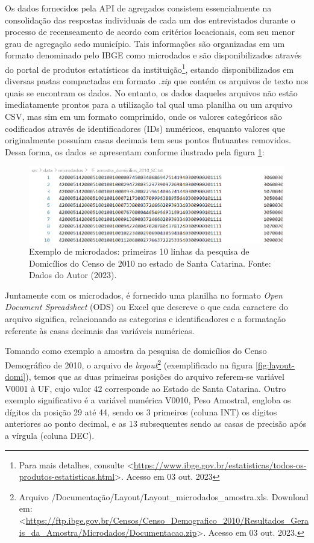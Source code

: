     Os dados fornecidos pela API de agregados consistem essencialmente na consolidação das respostas individuais de cada um dos entrevistados durante o processo de recenseamento de acordo com critérios locacionais, com seu menor grau de agregação sedo município. Tais informações são organizadas em um formato denominado pelo IBGE como microdados e são disponibilizados através do portal de produtos estatísticos da instituição\footnote{Para mais detalhes, consulte <\url{https://www.ibge.gov.br/estatisticas/todos-os-produtos-estatisticas.html}>. Acesso em 03 out. 2023}, estando disponibilizados em diversas pastas compactadas em formato \textit{.zip} que contém os arquivos de texto nos quais se encontram os dados. No entanto, os dados daqueles arquivos não estão imediatamente prontos para a utilização tal qual uma planilha ou um arquivo CSV, mas sim em um formato comprimido, onde os valores categóricos são codificados através de identificadores (IDs) numéricos, enquanto valores que originalmente possuíam casas decimais tem seus pontos flutuantes removidos. Dessa forma, os dados se apresentam conforme ilustrado pela figura \ref{fig:exemplo-microdado}:

\begin{figure}[h]
    \centering
    \includegraphics[width=\textwidth]{files/img/exemplo_microdado.png}
    \caption{Exemplo de microdados: primeiras 10 linhas da pesquisa de Domicílios do Censo de 2010 no estado de Santa Catarina. Fonte: Dados do Autor (2023).}
    \label{fig:exemplo-microdado}
\end{figure}

    Juntamente com os microdados, é fornecido uma planilha no formato \textit{Open Document Spreadsheet} (ODS) ou Excel que descreve o que cada caractere do arquivo significa, relacionando as categorias e identificadores e a formatação referente às casas decimais das variáveis numéricas. 
    
    Tomando como exemplo a amostra da pesquisa de domicílios do Censo Demográfico de 2010, o arquivo de \textit{layout}\footnote{\label{fn-layout-domi}Arquivo /Documentação/Layout/Layout\_microdados\_amostra.xls. Download em: <\url{https://ftp.ibge.gov.br/Censos/Censo_Demografico_2010/Resultados_Gerais_da_Amostra/Microdados/Documentacao.zip}>. Acesso em 03 out. 2023.} (exemplificado na figura \ref{fig:layout-domi}), temos que as duas primeiras posições do arquivo referem-se variável V0001 à UF, cujo valor 42 corresponde ao Estado de Santa Catarina. Outro exemplo significativo é a variável numérica V0010, Peso Amostral, engloba os dígitos da posição 29 até 44, sendo os 3 primeiros (coluna INT) os dígitos anteriores ao ponto decimal, e as 13 subsequentes sendo as casas de precisão após a vírgula (coluna DEC).

